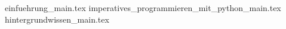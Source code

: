 
{einfuehrung_main.tex}
{imperatives_programmieren_mit_python_main.tex}
{hintergrundwissen_main.tex}

